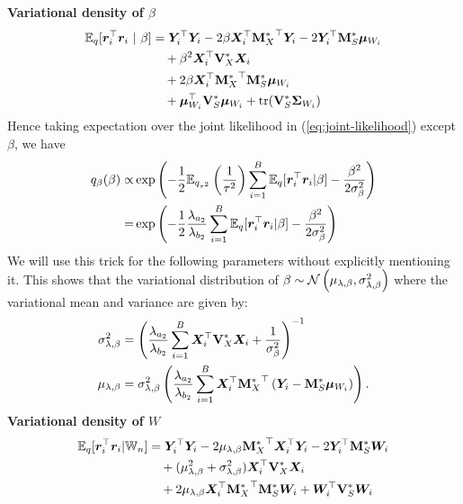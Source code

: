 \documentclass[numsec,webpdf,modern,medium,namedate]{oup-authoring-template}
\theoremstyle{thmstyleone}%
\theoremstyle{thmstyletwo}%
\theoremstyle{thmstylethree}%
\begin{document}
\textbf{Variational density of $\beta$}
\begin{equation}\label{eq:residualsq-conditional-beta}
    \begin{split}
        \mathbb{E}_q[\boldsymbol{r}_i^\top \boldsymbol{r}_i \ |\ \beta]
        & = \boldsymbol{Y}_i^\top \boldsymbol{Y}_i - 2\beta \boldsymbol{X}_i^\top {\mathbf{M}^
        \ast_X}^\top \boldsymbol{Y}_i - 2 \boldsymbol{Y}_i^\top \mathbf{M}^\ast_S \boldsymbol{\mu}_{W_i} \\
        &\quad + \beta^2 \boldsymbol{X}_i^\top \mathbf{V}^\ast_X \boldsymbol{X}_i \\
        &\quad + 2 \beta \boldsymbol{X}_i^\top {\mathbf{M}^\ast_X}^\top \mathbf{M}^\ast_S \boldsymbol{\mu}_{W_i} \\
        &\quad + \boldsymbol{\mu}_{W_i}^\top \mathbf{V}^\ast_S \boldsymbol{\mu}_{W_i} + \text{tr}(\mathbf{V}^\ast_S \boldsymbol{\Sigma}_{W_i})
    \end{split}
\end{equation}
Hence taking expectation over the joint likelihood in (\ref{eq:joint-likelihood}) except $\beta$, we have 
\begin{equation*}
    \begin{split}
        q_\beta(\beta) \propto & \exp\left(-\frac{1}{2} \mathbb{E}_{q_{\tau^2}}\left(\frac{1}{\tau^2}\right) \sum_{i=1}^B \mathbb{E}_q[\boldsymbol{r}_i^\top \boldsymbol{r}_i | \beta] - \frac{\beta^2}{2 \sigma^2_{\beta}}\right)\\
        = & \exp\left(-\frac{1}{2} \frac{\lambda_{a_2}}{\lambda_{b_2}} \sum_{i=1}^B \mathbb{E}_q[\boldsymbol{r}_i^\top \boldsymbol{r}_i | \beta] - \frac{\beta^2}{2 \sigma^2_{\beta}}\right)
    \end{split}
\end{equation*}
We will use this trick for the following parameters without explicitly mentioning it. This shows that the variational distribution of 
$\beta \sim \mathcal{N}\left(\mu_{\lambda, \beta}, \sigma^2_{\lambda, \beta}\right)$ where the variational mean and variance are given by:
\begin{equation*}
    \begin{split}
    \sigma^2_{\lambda, \beta} & = \left( \frac{\lambda_{a_2}}{\lambda_{b_2}} \sum_{i=1}^B \boldsymbol{X}_i^\top \mathbf{V}^\ast_X \boldsymbol{X}_i + \frac{1}{\sigma_\beta^2} \right)^{-1}\\
    \mu_{\lambda, \beta} & = \sigma^2_{\lambda, \beta} \left( \frac{\lambda_{a_2}}{\lambda_{b_2}}\sum_{i=1}^B \boldsymbol{X}_i^\top {\mathbf{M}^\ast_X}^\top \left(\boldsymbol{Y}_i - \mathbf{M}^\ast_S \boldsymbol{\mu}_{W_i}\right) \right).
    \end{split}
\end{equation*}
\textbf{Variational density of $W$}
\begin{align*}
\mathbb{E}_q[\boldsymbol{r}_i^\top \boldsymbol{r}_i | \mathbb{W}_n] 
&= \boldsymbol{Y}_i^\top \boldsymbol{Y}_i- 2 \mu_{\lambda, \beta} {\mathbf{M}^\ast_X}^\top \boldsymbol{X}_i^\top \boldsymbol{Y}_i - 2 \boldsymbol{Y}_i^\top \mathbf{M}^\ast_S \boldsymbol{W}_i \\
&\quad + (\mu_{\lambda, \beta}^2 + \sigma^2_{\lambda, \beta}) \boldsymbol{X}_i^\top \mathbf{V}^\ast_X \boldsymbol{X}_i \\
&\quad + 2 \mu_{\lambda, \beta} \boldsymbol{X}_i^\top {\mathbf{M}^\ast_X}^\top \mathbf{M}^\ast_S \boldsymbol{W}_i + \boldsymbol{W}_i^\top \mathbf{V}^\ast_S \boldsymbol{W}_i
\end{align*}
\end{document}
